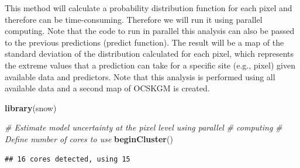 \documentclass[10pt,b5paper,]{book}
\newenvironment{Shaded}{\begin{snugshade}}{\end{snugshade}}
\newcommand{\CommentTok}[1]{\textcolor[rgb]{0.56,0.35,0.01}{\textit{#1}}}
\newcommand{\DataTypeTok}[1]{\textcolor[rgb]{0.13,0.29,0.53}{#1}}
\newcommand{\KeywordTok}[1]{\textcolor[rgb]{0.13,0.29,0.53}{\textbf{#1}}}
\newcommand{\NormalTok}[1]{#1}
\newcommand{\OperatorTok}[1]{\textcolor[rgb]{0.81,0.36,0.00}{\textbf{#1}}}
\newcommand{\StringTok}[1]{\textcolor[rgb]{0.31,0.60,0.02}{#1}}
\theoremstyle{definition}
\theoremstyle{definition}
\theoremstyle{definition}
\theoremstyle{remark}
\begin{document}
This method will calculate a probability distribution function for each
pixel and therefore can be time-consuming. Therefore we will run it
using parallel computing. Note that the code to run in parallel this
analysis can also be passed to the previous predictions (predict
function). The result will be a map of the standard deviation of the
distribution calculated for each pixel, which represents the extreme
values that a prediction can take for a specific site (e.g., pixel)
given available data and predictors. Note that this analysis is
performed using all available data and a second map of OCSKGM is
created.

\begin{Shaded}
\begin{Highlighting}[]
\KeywordTok{library}\NormalTok{(snow)}

\CommentTok{# Estimate model uncertainty at the pixel level using parallel }
\CommentTok{# computing}
\CommentTok{# Define number of cores to use}
\KeywordTok{beginCluster}\NormalTok{()}
\end{Highlighting}
\end{Shaded}

\begin{verbatim}
## 16 cores detected, using 15
\end{verbatim}

\begin{Shaded}
\end{Shaded}
\end{document}
